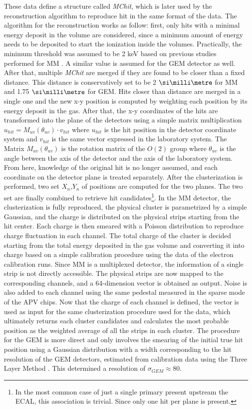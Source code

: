 These data define a structure called \textit{MChit}, which is later used by the reconstruction algorithm to reproduce hit in the same format of the data. The algorithm for the reconstruction works as follow: first, only hits with a minimal energy deposit in the volume are considered, since a minimum amount of energy needs to be deposited to start the ionization inside the volumes. Practically, the minimum threshold was assumed to be 2 keV based on previous studies performed for MM \cite{IGUAZ20121079}. A similar value is assumed for the GEM detector as well. After that, multiple \textit{MChit} are merged if they are found to be closer than a fixed distance. This distance is conservatively set to be 2 $\mmi$  for MM and 1.75 $\mmi$  for GEM. Hits closer than distance are merged in a single one and the new x-y position is computed by weighting each position by its energy deposit in the gas. After that, the x-y coordinates of the hits are transformed into the plane of the detectors using a simple matrix multiplication $u_{hit} = M_{uv}(\theta_{uv}) \cdot v_{hit}$ where $u_{hit}$ is the hit position in the detector coordinate system and $v_{hit}$ is the same vector expressed in the laboratory system. The Matrix $M_{uv}(\theta_{uv})$ is the rotation matrix of the $O(2)$ group where $\theta_{uv}$ is the angle between the axis of the detector and the axis of the laboratory system. From here, knowledge of the original hit is no longer assumed, and each coordinate on the detector plane is treated separately. After the clusterization is performed, two set $X_n$,$Y_n$ of positions are computed for the two planes. The two set are finally combined to retrieve hit candidates\footnote{In the most common case of just a single primary present upstream the ECAL, this association is trivial. Since only one hit per plane is present.}. In the MM detector, the clusterization is fully reproduced, the physical cluster is parametrized by a simple Gaussian, and the charge is distributed on the physical strips starting from the hit center. Each charge is then smeared with a Poisson distribution to reproduce charge fluctuation in each channel. The total charge of the cluster is decided starting from the total energy deposited in the gas volume and converting it into charge based on a simple calibration procedure using the data of the electron calibration runs. Since MM is a multiplexed detector, the information of a single strip is not directly accessible. The physical strips are now mapped to the corresponding channels, and a 64-dimension vector is obtained as output. Noise is also added to each channel using the same pedestal measured in the sparse mode of the APV chips. Now that the charge of each channel is defined, the vector is used as input for the same clusterization procedure used for the data, which ultimately returns each cluster candidates and calculates the most probable position as the weighted average of all the strips in each cluster. The procedure for the GEM is more direct and only involves the smearing of the initial true hit position using a Gaussian distribution with a width corresponding to the hit resolution of the GEM detectors, estimated from calibration data using the Three Layer Method \cite{Bortfeldt:2014vvt}. This determined a resolution of $\sigma_{GEM} \approx 80$\mum. 